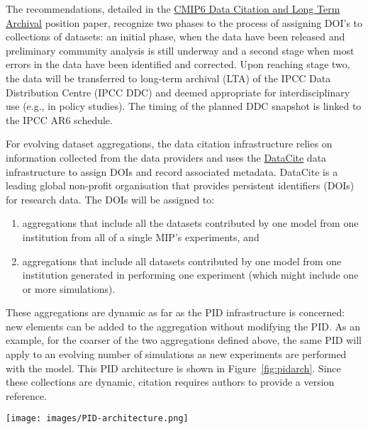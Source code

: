 \documentclass[gmd,manuscript]{copernicus}
\newcommand{\figref}[1] {\mbox{Figure   \ref{fig:#1}}}
\begin{document}
The recommendations, detailed in the
\href{https://goo.gl/BFn9Hq}{CMIP6 Data Citation and Long Term
  Archival} position paper, recognize two phases to the process of
assigning DOI's to collections of datasets: an initial phase, when the
data have been released and preliminary community analysis is still
underway and a second stage when most errors in the data have been
identified and corrected. Upon reaching stage two, the data will be
transferred to long-term archival (LTA) of the IPCC Data Distribution
Centre (IPCC DDC) and deemed appropriate for interdisciplinary use
(e.g., in policy studies). The timing of the planned DDC snapshot is
linked to the IPCC AR6 schedule.

For evolving dataset aggregations, the data citation infrastructure
relies on information collected from the data providers and uses the
\href{https://www.datacite.org/dois.html}{DataCite} data
infrastructure to assign DOIs and record associated metadata.
DataCite is a leading global non-profit organisation that provides
persistent identifiers (DOIs) for research data. The DOIs will be
assigned to:

\begin{enumerate}
\item aggregations that include all the datasets contributed by one
  model from one institution from all of a single MIP's experiments,
  and
\item aggregations that include all datasets contributed by one model
  from one institution generated in performing one experiment (which
  might include one or more simulations).
\end{enumerate}

These aggregations are dynamic as far as the PID infrastructure is
concerned: new elements can be added to the aggregation without
modifying the PID. As an example, for the coarser of the two
aggregations defined above, the same PID will apply to an evolving
number of simulations as new experiments are performed with the model.
This PID architecture is shown in \figref{pidarch}. Since these
collections are dynamic, citation requires authors to provide a
version reference.

\begin{figure*}
  \begin{center}
    \texttt{[image: images/PID-architecture.png]}
  \end{center}
  \caption{PID architecture, showing layers in the PID hierarchy. In
    the lower layers of the hierarchy, PIDs are static once generated,
    and new datasets generate new versions with new PIDs.}
  \label{fig:pidarch}
\end{figure*}
\end{document}
